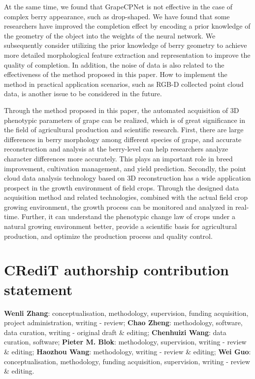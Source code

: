 \documentclass[12pt]{article}
\begin{document}
At the same time, we found that GrapeCPNet is not effective in the case of complex berry appearance, such as drop-shaped. 
We have found that some researchers \citep{pan_panoptic_2023,magistri_efficient_2024} have improved the completion effect by encoding a prior knowledge of the geometry of the object into the weights of the neural network. 
We subsequently consider utilizing the prior knowledge of berry geometry to achieve more detailed morphological feature extraction and representation to improve the quality of completion. 
In addition, the noise of data is also related to the effectiveness of the method proposed in this paper. 
How to implement the method in practical application scenarios, such as RGB-D collected point cloud data, is another issue to be considered in the future. 

Through the method proposed in this paper, the automated acquisition of 3D phenotypic parameters of grape can be realized, which is of great significance in the field of agricultural production and scientific research. 
First, there are large differences in berry morphology among different species of grape, and accurate reconstruction and analysis at the berry-level can help researchers analyze character differences more accurately. 
This plays an important role in breed improvement, cultivation management, and yield prediction. 
Secondly, the point cloud data analysis technology based on 3D reconstruction has a wide application prospect in the growth environment of field crops. 
Through the designed data acquisition method and related technologies, combined with the actual field crop growing environment, the growth process can be monitored and analyzed in real-time. 
Further, it can understand the phenotypic change law of crops under a natural growing environment better, provide a scientific basis for agricultural production, and optimize the production process and quality control.


\section*{CRediT authorship contribution statement}
\textbf{Wenli Zhang}: conceptualisation, methodology, supervision, funding acquisition, project administration, writing - review; \textbf{Chao Zheng}: methodology, software, data curation, writing - original draft \& editing; \textbf{Chenhuizi Wang}: data curation, software; \textbf{Pieter M. Blok}: methodology, supervision, writing - review \& editing; \textbf{Haozhou Wang}: methodology, writing - review \& editing; \textbf{Wei Guo}: conceptualisation, methodology, funding acquisition, supervision, writing - review \& editing.
\end{document}
